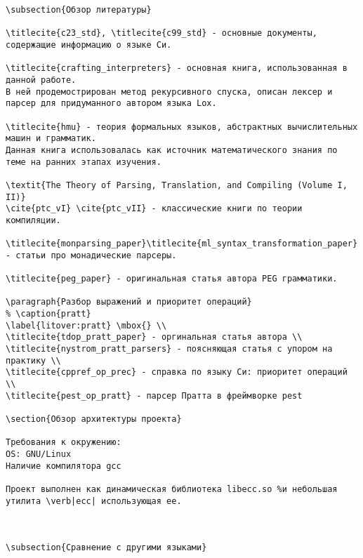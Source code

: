 {\begin{verbatim}
\subsection{Обзор литературы}

\titlecite{c23_std}, \titlecite{c99_std} - основные документы, содержащие информацию о языке Си.

\titlecite{crafting_interpreters} - основная книга, использованная в данной работе. 
В ней продемострирован метод рекурсивного спуска, описан лексер и парсер для придуманного автором языка Lox.

\titlecite{hmu} - теория формальных языков, абстрактных вычислительных машин и грамматик. 
Данная книга использовалась как источник математического знания по теме на ранних этапах изучения.

\textit{The Theory of Parsing, Translation, and Compiling (Volume I, II)}
\cite{ptc_vI} \cite{ptc_vII} - классические книги по теории компиляции.

\titlecite{monparsing_paper}\titlecite{ml_syntax_transformation_paper} - статьи про монадические парсеры.

\titlecite{peg_paper} - оригинальная статья автора PEG грамматики.

\paragraph{Разбор выражений и приоритет операций}
% \caption{pratt}
\label{litover:pratt} \mbox{} \\
\titlecite{tdop_pratt_paper} - оргинальная статья автора \\
\titlecite{nystrom_pratt_parsers} - поясняющая статья с упором на практику \\
\titlecite{cppref_op_prec} - справка по языку Си: приоритет операций \\
\titlecite{pest_op_pratt} - парсер Пратта в фреймворке pest

\section{Обзор архитектуры проекта}

Требования к окружению:
OS: GNU/Linux
Наличие компилятора gcc

Проект выполнен как динамическая библиотека libecc.so %и небольшая утилита \verb|ecc| использующая ее.



\subsection{Сравнение с другими языками}

\end{verbatim}}
